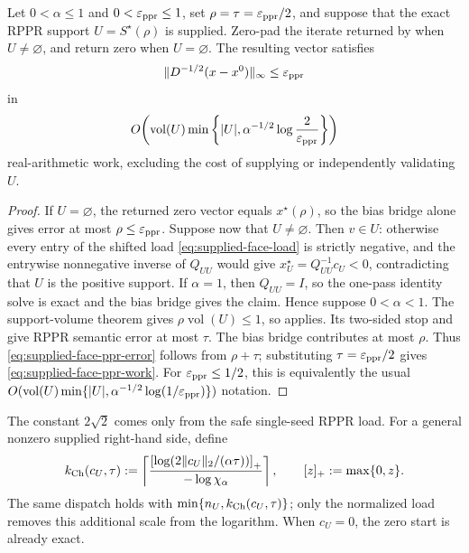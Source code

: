 \begin{corollary}
\label{cor:supplied-face-ppr-dispatch}
Let $0<\alpha\leq1$ and $0<\varepsilon_{\rm ppr}\leq1$, set
$\rho=\tau=\varepsilon_{\rm ppr}/2$, and suppose that the exact RPPR support
$U=S^\star(\rho)$ is supplied.  Zero-pad the iterate returned by
 when $U\ne\varnothing$, and return zero
when $U=\varnothing$.  The resulting vector satisfies
\begin{equation}
 \|D^{-1/2}(x-x^0)\|_\infty\leq\varepsilon_{\rm ppr}
 \label{eq:supplied-face-ppr-error}
\end{equation}
in
\begin{equation}
 O\!\left(\operatorname{vol}(U)
 \min\left\{|U|,\alpha^{-1/2}
 \log\frac2{\varepsilon_{\rm ppr}}\right\}\right)
 \label{eq:supplied-face-ppr-work}
\end{equation}
real-arithmetic work, excluding the cost of supplying or independently
validating $U$.
\end{corollary}

\begin{proof}
If $U=\varnothing$, the returned zero vector equals $x^\star(\rho)$, so the
bias bridge alone gives error at most $\rho\leq\varepsilon_{\rm ppr}$.
Suppose now that $U\ne\varnothing$.  Then $v\in U$: otherwise every entry of
the shifted load \eqref{eq:supplied-face-load} is strictly negative, and the
entrywise nonnegative inverse of $Q_{UU}$ would give
$x_U^\star=Q_{UU}^{-1}c_U<0$, contradicting that $U$ is the positive support.
If $\alpha=1$, then $Q_{UU}=I$, so the one-pass identity solve is exact and
the bias bridge gives the claim.  Hence suppose $0<\alpha<1$.
The support-volume theorem gives
$\rho\operatorname{vol}(U)\leq1$, so
 applies.  Its two-sided stop and
 give RPPR semantic error at most
$\tau$.  The bias bridge  contributes at most $\rho$.
Thus \eqref{eq:supplied-face-ppr-error} follows from $\rho+\tau$; substituting
$\tau=\varepsilon_{\rm ppr}/2$ gives \eqref{eq:supplied-face-ppr-work}.
For $\varepsilon_{\rm ppr}\leq1/2$, this is equivalently the usual
$O(\operatorname{vol}(U)\min\{|U|,
\alpha^{-1/2}\log(1/\varepsilon_{\rm ppr})\})$ notation.
\end{proof}

The constant $2\sqrt2$ comes only from the safe single-seed RPPR load.  For a
general nonzero supplied right-hand side, define
\begin{equation}
 k_{\rm Ch}(c_U,\tau):=
 \left\lceil
  \frac{\left[\log\!\left(2\|c_U\|_2/(\alpha\tau)\right)\right]_+}
       {-\log\chi_\alpha}
 \right\rceil,
 \qquad [z]_+:=\max\{0,z\}.
 \label{eq:supplied-face-general-load}
\end{equation}
The same dispatch holds with
$\min\{n_U,k_{\rm Ch}(c_U,\tau)\}$; only the normalized load removes this
additional scale from the logarithm.
When $c_U=0$, the zero start is already exact.

